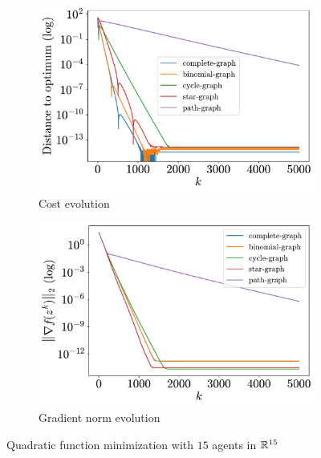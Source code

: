 \documentclass[a4paper,11pt,oneside]{book}
\begin{document}
\begin{figure}[tb!]
      \centering
      \begin{subfigure}[t]{0.46\linewidth}
            \centering
            \includegraphics[width=\linewidth]{./figs/quadratic/15_15/distance.pdf} 
            \caption{Cost evolution}
      \end{subfigure}
      \hfill
      \begin{subfigure}[t]{0.46\linewidth}
            \centering
            \includegraphics[width=\linewidth]{./figs/quadratic/15_15/gradient.pdf} 
            \caption{Gradient norm evolution}
      \end{subfigure}
      \caption{Quadratic function minimization with $15$ agents in ${\mathbb{R}}^{15}$}
      \label{fig:quadratic_15_15}
\end{figure}
\end{document}
